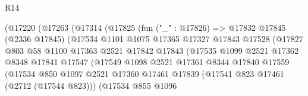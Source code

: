 \begin{lexlean}{R14}
\begin{coremodule}
                                (@17220
                                  (@17263
                                    (@17314
                                      (@17825
                                        (fun ("_" : @17826) =>
                                        @17832
                                          @17845
                                          (@2336 @17845)
                                          (@17534
                                            @1101
                                            @1075
                                            @17365
                                            @17327
                                            @17843
                                            @17528
                                            (@17827
                                              @803
                                              @58
                                              @1100
                                              @17363
                                              @2521
                                              @17842
                                              @17843
                                              (@17535
                                                @1099
                                                @2521
                                                @17362
                                                @8348
                                                @17841
                                                @17547
                                                (@17549
                                                  @1098
                                                  @2521
                                                  @17361
                                                  @8344
                                                  @17840
                                                  @17559
                                                  (@17534
                                                    @850
                                                    @1097
                                                    @2521
                                                    @17360
                                                    @17461
                                                    @17839
                                                    (@17541 @823 @17461 (@2712 (@17544 @823)))
                                                    (@17534
                                                      @855
                                                      @1096

\end{coremodule}
\end{lexlean}
